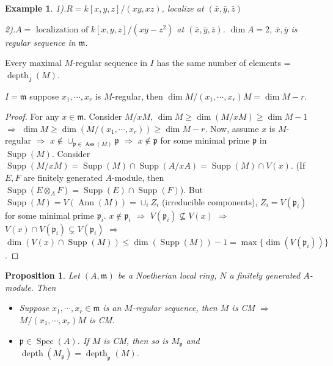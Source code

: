 \documentclass[cs4size]{article}
\newcommand{\frm}{\mathfrak{m}}
\newcommand{\frp}{\mathfrak{p}}
\newcommand{\Ra}{\Rightarrow}
\DeclareMathOperator{\Ann}{Ann}
\DeclareMathOperator{\Spec}{Spec}
\DeclareMathOperator{\Supp}{Supp}
\DeclareMathOperator{\Ass}{Ass}
\DeclareMathOperator{\depth}{depth}
\newtheorem{prop}{Proposition}
\newtheorem{ex}{Example}
\begin{document}
\begin{ex}
1).$R=k[x,y,z]/(xy,xz)$, localize at $(\bar{x},\bar{y},\bar{z})$

2).$A=\text{ localization of }k[x,y,z]/(xy-z^2)$ at $(\bar{x},\bar{y},\bar{z})$. $\dim A=2$, $\bar{x},\bar{y}$ is regular sequence in $\frm$.
\end{ex}

Every maximal $M$-regular sequence in $I$ has the same number of elements =$\depth_I(M)$.

$I=\frm$ suppose $x_1,\cdots,x_r$ is $M$-regular, then $\dim M/(x_1,\cdots,x_r)M=\dim M-r$.
\begin{proof}
For any $x\in \frm$. Consider $M/xM$, $\dim M\geq \dim (M/xM)\geq \dim M-1$ $\Ra$ $\dim M\geq \dim (M/(x_1,\cdots,x_r))\geq \dim M-r$. Now, assume $x$ is $M$-regular $\Ra$ $x\notin \cup_{\frp\in\Ass(M)}\frp$ $\Ra$ $x\notin \frp$ for some minimal prime $\frp$ in $\Supp(M)$. Consider $\Supp(M/xM)=\Supp(M)\cap\Supp(A/xA)=\Supp(M)\cap V(x)$. (If $E, F$ are finitely generated $A$-module, then $\Supp(E\otimes_AF)=\Supp(E)\cap\Supp(F)$). But $\Supp(M)=V(\Ann(M))=\cup_iZ_i$ (irreducible components), $Z_i=V(\frp_i)$ for some minimal prime $\frp_i$. $x\notin \frp_i$ $\Ra$ $V(\frp_i)\nsubseteq V(x)$ $\Ra$ $V(x)\cap V(\frp_i)\varsubsetneq V(\frp_i)$ $\Ra$ $\dim (V(x)\cap\Supp (M))\leq \dim (\Supp(M))-1=\max\{\dim (V(\frp_i))\}$.
\end{proof}

\begin{prop}
Let $(A,\frm)$ be a Noetherian local ring, $N$ a finitely generated $A$-module. Then
\begin{itemize}
\item Suppose $x_1,\cdots,x_r\in\frm$ is an $M$-regular sequence, then $M$ is CM $\Ra$ $M/(x_1,\cdots,x_r)M$ is CM.
\item $\frp\in \Spec (A)$. If $M$ is CM, then so is $M_\frp$ and $\depth (M_\frp)=\depth_\frp (M)$.
\end{itemize}
\end{prop}
\end{document}
